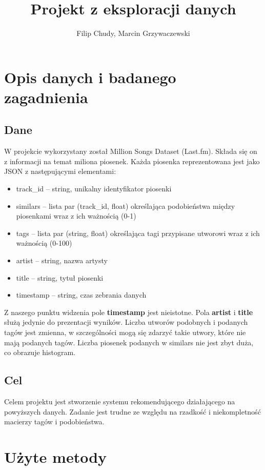 \documentclass[a4paper,10pt]{article}
\title{Projekt z eksploracji danych}
\author{Filip Chudy, Marcin Grzywaczewski}
\begin{document}
\maketitle

\begin{abstract}

\end{abstract}
\section{Opis danych i badanego zagadnienia}
\subsection{Dane}
W projekcie wykorzystany został Million Songs Dataset (Last.fm). 
Składa się on z informacji na temat miliona piosenek.
Każda piosenka reprezentowana jest jako JSON z następującymi elementami:
\begin{itemize}
 \item track\_id -- string, unikalny identyfikator piosenki
 \item similars -- lista par (track\_id, float) określająca podobieństwa między piosenkami wraz z ich ważnością (0-1)
 \item tags -- lista par (string, float) określająca tagi przypisane utworowi wraz z ich ważnością (0-100)
 \item artist -- string, nazwa artysty
 \item title -- string, tytuł piosenki
 \item timestamp -- string, czas zebrania danych
\end{itemize}

Z naszego punktu widzenia pole \textbf{timestamp} jest nieistotne.
Pola \textbf{artist} i \textbf{title} służą jedynie do prezentacji wyników.
Liczba utworów podobnych i podanych tagów jest zmienna, w szczególności mogą się zdarzyć takie utwory, które nie mają podanych tagów.
Liczba piosenek podanych w similars nie jest zbyt duża, co obrazuje histogram.

\subsection{Cel}
Celem projektu jest stworzenie systemu rekomendującego działającego na powyższych danych.
Zadanie jest trudne ze względu na rzadkość i niekompletność macierzy tagów i podobieństwa.

\section{Użyte metody}
\end{document}
